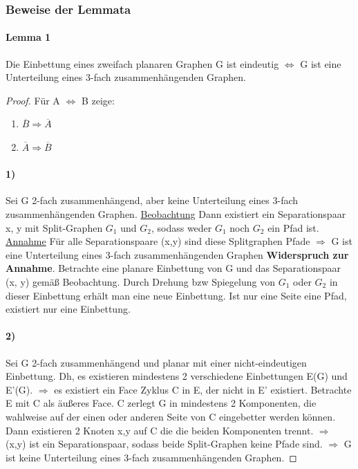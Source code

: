 \subsubsection{Beweise der Lemmata}

\paragraph{Lemma 1} Die Einbettung eines zweifach planaren Graphen G ist eindeutig $ \Leftrightarrow $ G ist eine Unterteilung eines 3-fach zusammenhängenden Graphen.

\begin{proof}
Für A $ \Leftrightarrow $ B zeige:
\begin{enumerate}
    \item $ \overline{B}  \Rightarrow \overline{A}$
    \item $ \overline{A}  \Rightarrow \overline{B}$
\end{enumerate}

\paragraph{1)} Sei G 2-fach zusammenhängend, aber keine Unterteilung eines 3-fach zusammenhängenden Graphen. \underline{Beobachtung} Dann existiert ein Separationspaar x, y mit Split-Graphen $ G_1 $ und $ G_2 $, sodass weder $ G_1 $ noch $ G_2 $ ein Pfad ist. \underline{Annahme} Für alle Separationspaare (x,y) sind diese Splitgraphen Pfade $ \Rightarrow $ G ist eine Unterteilung eines 3-fach zusammenhängenden Graphen \textbf{Widerspruch zur Annahme}. Betrachte eine planare Einbettung von G und das Separationspaar (x, y) gemäß Beobachtung. Durch Drehung bzw Spiegelung von $ G_1 $ oder $ G_2 $ in dieser Einbettung erhält man eine neue Einbettung. Ist nur eine Seite eine Pfad, existiert nur eine Einbettung.
\paragraph{2)} Sei G 2-fach zusammenhängend und planar mit einer nicht-eindeutigen Einbettung. Dh, es existieren mindestens 2 verschiedene Einbettungen E(G) und E'(G). $ \Rightarrow $ es existiert ein Face Zyklus C in E, der nicht in E' existiert. Betrachte E mit C als äußeres Face. C zerlegt G in mindestens 2 Komponenten, die wahlweise auf der einen oder anderen Seite von C eingebetter werden können. Dann existieren 2 Knoten x,y auf C die die beiden Komponenten trennt. $ \Rightarrow $ (x,y) ist ein Separationspaar, sodass beide Split-Graphen keine Pfade sind. $ \Rightarrow $ G ist keine Unterteilung eines 3-fach zusammenhängenden Graphen.
\end{proof}

